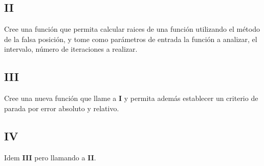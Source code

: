 \documentclass[a4paper,11pt]{article}
\theoremstyle{mytheor}
\begin{document}
\subsection*{II}
Cree una función que permita calcular raices de una función utilizando el método de la falsa posición, y tome como parámetros de entrada la función a analizar, el intervalo, número de iteraciones a realizar.


\subsection*{III}
Cree una nueva función que llame a \textbf{I} y permita además establecer un criterio de parada por error absoluto y relativo.

\subsection*{IV}
Idem \textbf{III} pero llamando a \textbf{II}.
\end{document}
